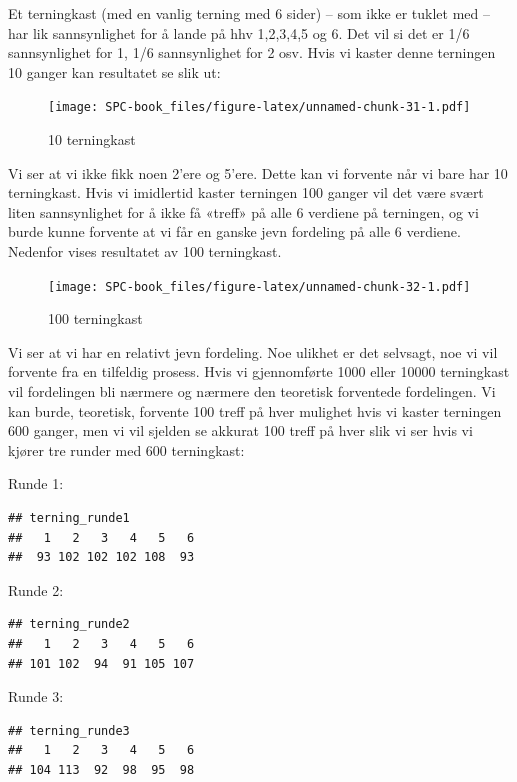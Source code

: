 \documentclass[
]{book}
\begin{document}
Et terningkast (med en vanlig terning med 6 sider) -- som ikke er tuklet med -- har lik sannsynlighet for å lande på hhv 1,2,3,4,5 og 6. Det vil si det er 1/6 sannsynlighet for 1, 1/6 sannsynlighet for 2 osv. Hvis vi kaster denne terningen 10 ganger kan resultatet se slik ut:

\begin{figure}
\centering
\texttt{[image: SPC-book\_files/figure-latex/unnamed-chunk-31-1.pdf]}
\caption{\label{fig:unnamed-chunk-31}10 terningkast}
\end{figure}

Vi ser at vi ikke fikk noen 2'ere og 5'ere. Dette kan vi forvente når vi bare har 10 terningkast. Hvis vi imidlertid kaster terningen 100 ganger vil det være svært liten sannsynlighet for å ikke få «treff» på alle 6 verdiene på terningen, og vi burde kunne forvente at vi får en ganske jevn fordeling på alle 6 verdiene. Nedenfor vises resultatet av 100 terningkast.

\begin{figure}
\centering
\texttt{[image: SPC-book\_files/figure-latex/unnamed-chunk-32-1.pdf]}
\caption{\label{fig:unnamed-chunk-32}100 terningkast}
\end{figure}

Vi ser at vi har en relativt jevn fordeling. Noe ulikhet er det selvsagt, noe vi vil forvente fra en tilfeldig prosess. Hvis vi gjennomførte 1000 eller 10000 terningkast vil fordelingen bli nærmere og nærmere den teoretisk forventede fordelingen. Vi kan burde, teoretisk, forvente 100 treff på hver mulighet hvis vi kaster terningen 600 ganger, men vi vil sjelden se akkurat 100 treff på hver slik vi ser hvis vi kjører tre runder med 600 terningkast:

Runde 1:

\begin{verbatim}
## terning_runde1
##   1   2   3   4   5   6 
##  93 102 102 102 108  93
\end{verbatim}

Runde 2:

\begin{verbatim}
## terning_runde2
##   1   2   3   4   5   6 
## 101 102  94  91 105 107
\end{verbatim}

Runde 3:

\begin{verbatim}
## terning_runde3
##   1   2   3   4   5   6 
## 104 113  92  98  95  98
\end{verbatim}
\end{document}
